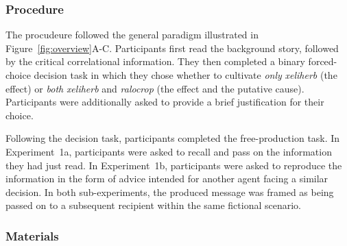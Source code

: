 \documentclass[10pt,letterpaper]{article}
\begin{document}
\subsubsection{Procedure}
The procudeure followed the general paradigm illustrated in Figure~\ref{fig:overview}A-C.
Participants first read the background story, followed by the critical correlational information. They then completed a binary forced-choice decision task in which they chose whether to cultivate \emph{only} \textit{xeliherb} (the effect) or \emph{both} \textit{xeliherb} and \textit{ralocrop} (the effect and the putative cause). Participants were additionally asked to provide a brief justification for their choice.

Following the decision task, participants completed the free-production task. In Experiment~1a, participants were asked to recall and pass on the information they had just read. In Experiment~1b, participants were asked to reproduce the information in the form of advice intended for another agent facing a similar decision. In both sub-experiments, the produced message was framed as being passed on to a subsequent recipient within the same fictional scenario.

\subsubsection{Materials}
\end{document}
